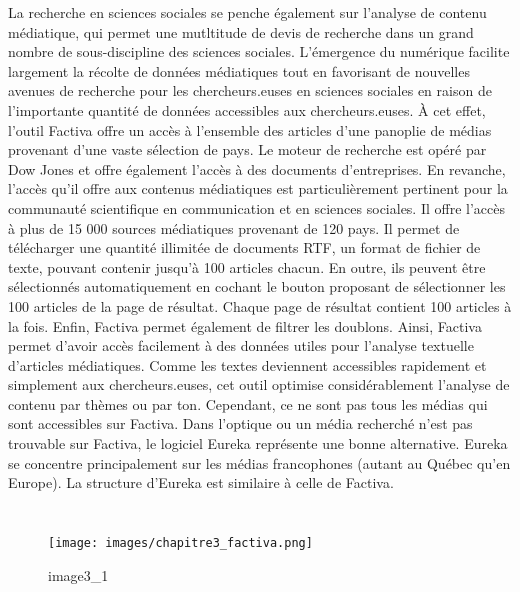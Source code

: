 \documentclass[
  letterpaper,
  DIV=11,
  numbers=noendperiod]{scrreprt}
\begin{document}
La recherche en sciences sociales se penche également sur l'analyse de
contenu médiatique, qui permet une mutltitude de devis de recherche dans
un grand nombre de sous-discipline des sciences sociales. L'émergence du
numérique facilite largement la récolte de données médiatiques tout en
favorisant de nouvelles avenues de recherche pour les chercheurs.euses
en sciences sociales en raison de l'importante quantité de données
accessibles aux chercheurs.euses. À cet effet, l'outil Factiva offre un
accès à l'ensemble des articles d'une panoplie de médias provenant d'une
vaste sélection de pays. Le moteur de recherche est opéré par Dow Jones
et offre également l'accès à des documents d'entreprises. En revanche,
l'accès qu'il offre aux contenus médiatiques est particulièrement
pertinent pour la communauté scientifique en communication et en
sciences sociales. Il offre l'accès à plus de 15 000 sources médiatiques
provenant de 120 pays. Il permet de télécharger une quantité illimitée
de documents RTF, un format de fichier de texte, pouvant contenir
jusqu'à 100 articles chacun. En outre, ils peuvent être sélectionnés
automatiquement en cochant le bouton proposant de sélectionner les 100
articles de la page de résultat. Chaque page de résultat contient 100
articles à la fois. Enfin, Factiva permet également de filtrer les
doublons. Ainsi, Factiva permet d'avoir accès facilement à des données
utiles pour l'analyse textuelle d'articles médiatiques. Comme les textes
deviennent accessibles rapidement et simplement aux chercheurs.euses,
cet outil optimise considérablement l'analyse de contenu par thèmes ou
par ton. Cependant, ce ne sont pas tous les médias qui sont accessibles
sur Factiva. Dans l'optique ou un média recherché n'est pas trouvable
sur Factiva, le logiciel Eureka représente une bonne alternative. Eureka
se concentre principalement sur les médias francophones (autant au
Québec qu'en Europe). La structure d'Eureka est similaire à celle de
Factiva.

\hypertarget{section}{%
\section{}\label{section}}

\begin{figure}

{\centering \texttt{[image: images/chapitre3\_factiva.png]}

}

\caption{image3\_1}

\end{figure}
\end{document}
